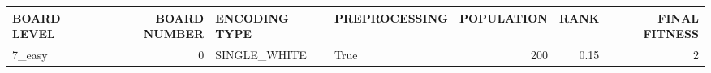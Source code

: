 \begin{tabular}{lrllrrr}
\hline
 BOARD LEVEL   &   BOARD NUMBER & ENCODING TYPE   & PREPROCESSING   &   POPULATION &   RANK &   FINAL FITNESS \\
\hline
 7\_easy        &              0 & SINGLE\_WHITE    & True            &          200 &   0.15 &               2 \\
\hline
\end{tabular}